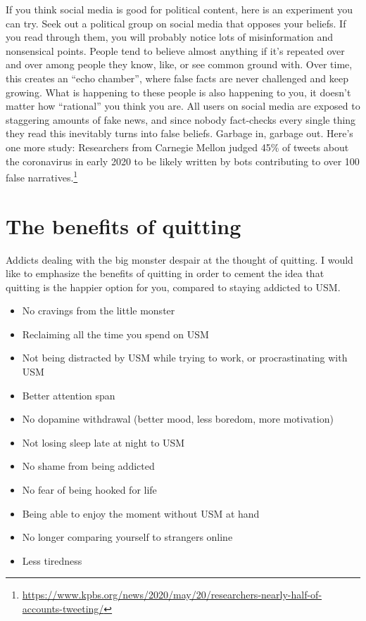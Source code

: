 \documentclass[
]{book}
\providecommand{\tightlist}{%
  \setlength{\itemsep}{0pt}\setlength{\parskip}{0pt}}
\begin{document}
If you think social media is good for political content, here is an experiment you can try. Seek out a political group on social media that opposes your beliefs. If you read through them, you will probably notice lots of misinformation and nonsensical points. People tend to believe almost anything if it's repeated over and over among people they know, like, or see common ground with. Over time, this creates an ``echo chamber'', where false facts are never challenged and keep growing. What is happening to these people is also happening to you, it doesn't matter how ``rational'' you think you are. All users on social media are exposed to staggering amounts of fake news, and since nobody fact-checks every single thing they read this inevitably turns into false beliefs. Garbage in, garbage out. Here's one more study: Researchers from Carnegie Mellon judged 45\% of tweets about the coronavirus in early 2020 to be likely written by bots contributing to over 100 false narratives.\footnote{\url{https://www.kpbs.org/news/2020/may/20/researchers-nearly-half-of-accounts-tweeting/}}

\section{The benefits of quitting}\label{the-benefits-of-quitting}

Addicts dealing with the big monster despair at the thought of quitting. I would like to emphasize the benefits of quitting in order to cement the idea that quitting is the happier option for you, compared to staying addicted to USM.

\begin{itemize}
\tightlist
\item
  No cravings from the little monster
\item
  Reclaiming all the time you spend on USM
\item
  Not being distracted by USM while trying to work, or procrastinating with USM
\item
  Better attention span
\item
  No dopamine withdrawal (better mood, less boredom, more motivation)
\item
  Not losing sleep late at night to USM
\item
  No shame from being addicted
\item
  No fear of being hooked for life
\item
  Being able to enjoy the moment without USM at hand
\item
  No longer comparing yourself to strangers online
\item
  Less tiredness
\end{itemize}
\end{document}

